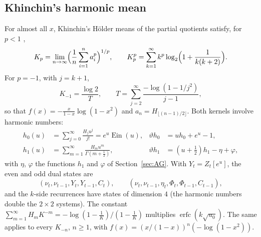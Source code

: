 \documentclass[11pt,reqno]{amsart}
\theoremstyle{definition}
\theoremstyle{remark}
\newcommand{\Ein}{\operatorname{Ein}}
\newcommand{\erfc}{\operatorname{erfc}}
\begin{document}
\subsection{Khinchin's harmonic mean}\label{sec:KH}
For almost all $x$, Khinchin's H\"older means of the partial quotients satisfy, for $p < 1$ \cite{BBC97},
\[
  K_p = \lim_{n\to\infty}\Bigl(\frac1n\sum_{i=1}^{n} a_i^p\Bigr)^{1/p}, \qquad
  K_p^p = \sum_{k=1}^{\infty}k^p\log_2\Bigl(1 + \frac1{k(k+2)}\Bigr).
\]
For $p = -1$, with $j = k+1$,
\[
  K_{-1} = \frac{\log 2}{T}, \qquad T = \sum_{j=2}^{\infty}\frac{-\log(1-1/j^2)}{j-1},
\]
so that $f(x) = -\frac{x}{1-x}\log(1-x^2)$ and $a_n = H_{\lfloor(n-1)/2\rfloor}$.
Both kernels involve harmonic numbers:
\begin{align*}
  h_0(u) &= \sum_{j=0}^{\infty}\frac{H_j u^j}{j!} = e^u\Ein(u), & \vartheta h_0 &= uh_0 + e^u - 1, \\
  h_1(u) &= \sum_{m=1}^{\infty}\frac{H_mu^m}{\Gamma(m+\frac12)}, & \vartheta h_1 &= (u+\tfrac12)h_1 - \eta + \varphi,
\end{align*}
with $\eta$, $\varphi$ the functions $h_1$ and $\varphi$ of Section~\ref{sec:AG}. With $Y_t = Z_t[e^u]$, the even
and odd dual states are
\[
  (\nu_t, \nu_{t-1}, Y_t, Y_{t-1}, C_t), \qquad (\nu_t, \nu_{t-1}, \eta_t, \Phi_t, \Phi_{t-1}, C_{t-1}),
\]
and
the $k$-side recurrences have states of dimension $4$ (the harmonic numbers double the $2\times2$ systems). The
constant $\sum_{m=1}^{\infty} H_mK^{-m} = -\log(1-\frac1K)/(1-\frac1K)$ multiplies $\erfc(k\sqrt{u_0})$.
The same applies to every $K_{-n}$, $n \ge 1$, with $f(x) = (x/(1-x))^n(-\log(1-x^2))$.
\end{document}
